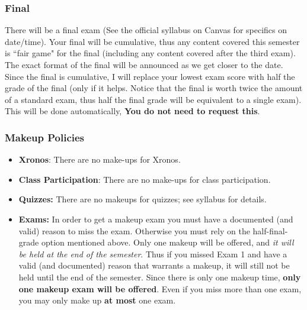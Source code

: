\documentclass{ximera}
\begin{document}
\subsubsection*{Final}
    There will be a final exam (See the official syllabus on Canvas for specifics on date/time). Your final will be cumulative, thus any content covered this semester is ``fair game" for the final (including any content covered after the third exam). The exact format of the final will be announced as we get closer to the date. Since the final is cumulative, I will replace your lowest exam score with half the grade of the final (only if it helps. Notice that the final is worth twice the amount of a standard exam, thus half the final grade will be equivalent to a single exam). This will be done automatically, \textbf{You do not need to request this}. 

            
\subsubsection*{Makeup Policies} %

    \begin{itemize}
        \item{\textbf{Xronos}:} There are no make-ups for Xronos.
        \item{\textbf{Class Participation}:} There are no make-ups for class participation.
        \item{\textbf{Quizzes:}} There are no makeups for quizzes; see syllabus for details.
        \item{\textbf{Exams:}} In order to get a makeup exam you must have a documented (and valid) reason to miss the exam. Otherwise you must rely on the half-final-grade option mentioned above. Only one makeup will be offered, and \textit{it will be held at the end of the semester}. Thus if you missed Exam 1 and have a valid (and documented) reason that warrants a makeup, it will still not be held until the end of the semester. Since there is only one makeup time, \textbf{only one makeup exam will be offered}. Even if you miss more than one exam, you may only make up \textbf{at most} one exam.
    \end{itemize}
\end{document}
